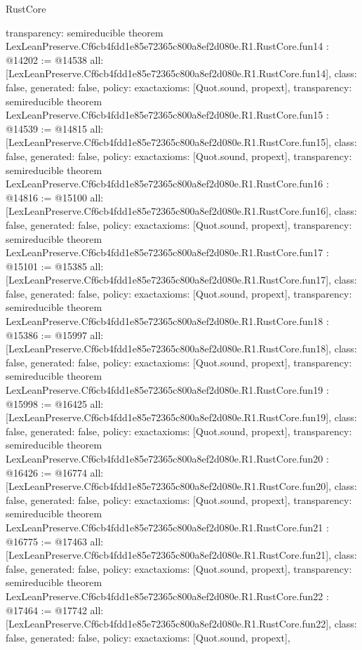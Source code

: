 \begin{lexlean}{RustCore}
\begin{coremodule}
{  transparency: semireducible
}
theorem LexLeanPreserve.Cf6cb4fdd1e85e72365c800a8ef2d080e.R1.RustCore.fun14 : @14202 := @14538 {
  all: [LexLeanPreserve.Cf6cb4fdd1e85e72365c800a8ef2d080e.R1.RustCore.fun14],
  class: false,
  generated: false,
  policy: exact{axioms: [Quot.sound, propext]},
  transparency: semireducible
}
theorem LexLeanPreserve.Cf6cb4fdd1e85e72365c800a8ef2d080e.R1.RustCore.fun15 : @14539 := @14815 {
  all: [LexLeanPreserve.Cf6cb4fdd1e85e72365c800a8ef2d080e.R1.RustCore.fun15],
  class: false,
  generated: false,
  policy: exact{axioms: [Quot.sound, propext]},
  transparency: semireducible
}
theorem LexLeanPreserve.Cf6cb4fdd1e85e72365c800a8ef2d080e.R1.RustCore.fun16 : @14816 := @15100 {
  all: [LexLeanPreserve.Cf6cb4fdd1e85e72365c800a8ef2d080e.R1.RustCore.fun16],
  class: false,
  generated: false,
  policy: exact{axioms: [Quot.sound, propext]},
  transparency: semireducible
}
theorem LexLeanPreserve.Cf6cb4fdd1e85e72365c800a8ef2d080e.R1.RustCore.fun17 : @15101 := @15385 {
  all: [LexLeanPreserve.Cf6cb4fdd1e85e72365c800a8ef2d080e.R1.RustCore.fun17],
  class: false,
  generated: false,
  policy: exact{axioms: [Quot.sound, propext]},
  transparency: semireducible
}
theorem LexLeanPreserve.Cf6cb4fdd1e85e72365c800a8ef2d080e.R1.RustCore.fun18 : @15386 := @15997 {
  all: [LexLeanPreserve.Cf6cb4fdd1e85e72365c800a8ef2d080e.R1.RustCore.fun18],
  class: false,
  generated: false,
  policy: exact{axioms: [Quot.sound, propext]},
  transparency: semireducible
}
theorem LexLeanPreserve.Cf6cb4fdd1e85e72365c800a8ef2d080e.R1.RustCore.fun19 : @15998 := @16425 {
  all: [LexLeanPreserve.Cf6cb4fdd1e85e72365c800a8ef2d080e.R1.RustCore.fun19],
  class: false,
  generated: false,
  policy: exact{axioms: [Quot.sound, propext]},
  transparency: semireducible
}
theorem LexLeanPreserve.Cf6cb4fdd1e85e72365c800a8ef2d080e.R1.RustCore.fun20 : @16426 := @16774 {
  all: [LexLeanPreserve.Cf6cb4fdd1e85e72365c800a8ef2d080e.R1.RustCore.fun20],
  class: false,
  generated: false,
  policy: exact{axioms: [Quot.sound, propext]},
  transparency: semireducible
}
theorem LexLeanPreserve.Cf6cb4fdd1e85e72365c800a8ef2d080e.R1.RustCore.fun21 : @16775 := @17463 {
  all: [LexLeanPreserve.Cf6cb4fdd1e85e72365c800a8ef2d080e.R1.RustCore.fun21],
  class: false,
  generated: false,
  policy: exact{axioms: [Quot.sound, propext]},
  transparency: semireducible
}
theorem LexLeanPreserve.Cf6cb4fdd1e85e72365c800a8ef2d080e.R1.RustCore.fun22 : @17464 := @17742 {
  all: [LexLeanPreserve.Cf6cb4fdd1e85e72365c800a8ef2d080e.R1.RustCore.fun22],
  class: false,
  generated: false,
  policy: exact{axioms: [Quot.sound, propext]},
}
\end{coremodule}
\end{lexlean}

